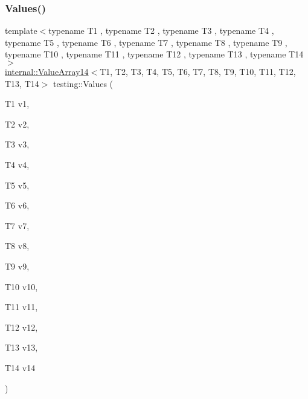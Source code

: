 \subsubsection{\texorpdfstring{Values()}{Values()}\hspace{0.1cm}{\footnotesize\ttfamily [14/50]}}
{\footnotesize\ttfamily template$<$typename T1 , typename T2 , typename T3 , typename T4 , typename T5 , typename T6 , typename T7 , typename T8 , typename T9 , typename T10 , typename T11 , typename T12 , typename T13 , typename T14 $>$ \\
\mbox{\hyperlink{classtesting_1_1internal_1_1ValueArray14}{internal\+::\+Value\+Array14}}$<$T1, T2, T3, T4, T5, T6, T7, T8, T9, T10, T11, T12, T13, T14$>$ testing\+::\+Values (\begin{DoxyParamCaption}\item[{T1}]{v1,  }\item[{T2}]{v2,  }\item[{T3}]{v3,  }\item[{T4}]{v4,  }\item[{T5}]{v5,  }\item[{T6}]{v6,  }\item[{T7}]{v7,  }\item[{T8}]{v8,  }\item[{T9}]{v9,  }\item[{T10}]{v10,  }\item[{T11}]{v11,  }\item[{T12}]{v12,  }\item[{T13}]{v13,  }\item[{T14}]{v14 }\end{DoxyParamCaption})}

\mbox{\label{namespacetesting_ab0c1943e4f680df0d92c695ed0ac36df}} 
